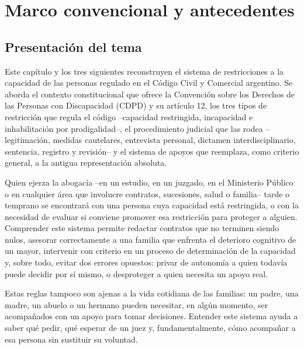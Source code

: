\documentclass[12pt,oneside]{book}
\begin{document}
\chapter{Marco convencional y antecedentes}
\label{ch:bloque1}

\section{Presentación del tema}

Este capítulo y los tres siguientes reconstruyen el sistema de restricciones a la capacidad de las personas regulado en el Código Civil y Comercial argentino. Se aborda el contexto constitucional que ofrece la Convención sobre los Derechos de las Personas con Discapacidad (CDPD) y su artículo 12, los tres tipos de restricción que regula el código --capacidad restringida, incapacidad e inhabilitación por prodigalidad--, el procedimiento judicial que las rodea --legitimación, medidas cautelares, entrevista personal, dictamen interdisciplinario, sentencia, registro y revisión-- y el sistema de apoyos que reemplaza, como criterio general, a la antigua representación absoluta.

Quien ejerza la abogacía --en un estudio, en un juzgado, en el Ministerio Público o en cualquier área que involucre contratos, sucesiones, salud o familia-- tarde o temprano se encontrará con una persona cuya capacidad está restringida, o con la necesidad de evaluar si conviene promover esa restricción para proteger a alguien. Comprender este sistema permite redactar contratos que no terminen siendo nulos, asesorar correctamente a una familia que enfrenta el deterioro cognitivo de un mayor, intervenir con criterio en un proceso de determinación de la capacidad y, sobre todo, evitar dos errores opuestos: privar de autonomía a quien todavía puede decidir por sí mismo, o desproteger a quien necesita un apoyo real.

Estas reglas tampoco son ajenas a la vida cotidiana de las familias: un padre, una madre, un abuelo o un hermano pueden necesitar, en algún momento, ser acompañados con un apoyo para tomar decisiones. Entender este sistema ayuda a saber qué pedir, qué esperar de un juez y, fundamentalmente, cómo acompañar a esa persona sin sustituir su voluntad.
\end{document}
